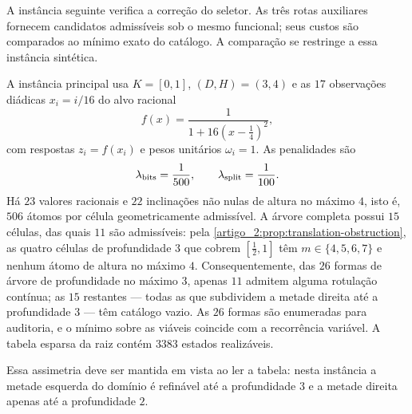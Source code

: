 A instância seguinte verifica a correção do seletor. As três rotas auxiliares fornecem candidatos admissíveis sob o mesmo funcional; seus custos são comparados ao mínimo exato do catálogo. A comparação se restringe a essa instância sintética.

A instância principal usa $K=[0,1]$, $(D,H)=(3,4)$ e as $17$ observações
diádicas $x_i=i/16$ do alvo racional
\begin{equation}
 f(x)=\frac{1}{1+16(x-\tfrac14)^2},
 \label{artigo_2:eq:experiment-target}
\end{equation}
com respostas $z_i=f(x_i)$ e pesos unitários $\omega_i=1$. As penalidades são
\[
 \lambda_{\rm bits}=\frac1{500},
 \qquad
 \lambda_{\rm split}=\frac1{100}.
\]
Há $23$ valores racionais e $22$ inclinações não nulas de altura no máximo
$4$, isto é, $506$ átomos por célula geometricamente admissível. A árvore
completa possui $15$ células, das quais $11$ são admissíveis: pela
\cref{artigo_2:prop:translation-obstruction}, as quatro células de profundidade $3$ que
cobrem $[\tfrac12,1]$ têm $m\in\{4,5,6,7\}$ e nenhum átomo de altura no
máximo $4$. Consequentemente, das $26$ formas de árvore de profundidade no
máximo $3$, apenas $11$ admitem alguma rotulação contínua; as $15$ restantes
--- todas as que subdividem a metade direita até a profundidade $3$ --- têm
catálogo vazio. As $26$ formas são enumeradas para auditoria, e o mínimo sobre
as viáveis coincide com a recorrência variável. A tabela esparsa da raiz
contém $3383$ estados realizáveis.

Essa assimetria deve ser mantida em vista ao ler a tabela: nesta instância a
metade esquerda do domínio é refinável até a profundidade $3$ e a metade
direita apenas até a profundidade $2$.

